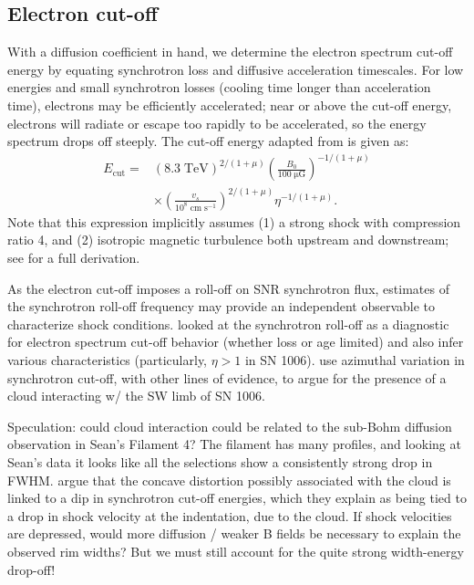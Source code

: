 \documentclass[iop, apj, numberedappendix, twocolappendix]{emulateapj}
\newcommand*{\mt}{\mathrm}
\newcommand*{\unit}[1]{\;\mt{#1}}  %
\newcommand*{\Ecut}{E_{\mt{cut}}}
\newcommand*{\muG}{\unit{\mu G}}
\begin{document}
\subsection{Electron cut-off}

With a diffusion coefficient in hand, we determine the electron spectrum
cut-off energy by equating synchrotron loss and diffusive acceleration
timescales.  For low energies and small synchrotron losses (cooling time longer
than acceleration time), electrons may be efficiently accelerated; near or
above the cut-off energy, electrons will radiate or escape too rapidly to be
accelerated, so the energy spectrum drops off steeply.  The cut-off energy
adapted from \citet{parizot2006} is given as:
\begin{align}
    \Ecut =
        &\left(8.3\unit{TeV}\right)^{2/(1+\mu)}
        \left(\frac{B_0}{100 \muG}\right)^{-1/(1+\mu)} \nonumber \\
        &\times \left(\frac{v_s}{10^8 \unit{cm\;s^{-1}}}\right)^{2/(1+\mu)}
        \eta^{-1 / (1+\mu)} .
\end{align}
Note that this expression implicitly assumes (1) a strong shock with
compression ratio 4, and (2) isotropic magnetic turbulence both upstream and
downstream; see \citet{parizot2006} for a full derivation.

As the electron cut-off imposes a roll-off on SNR synchrotron flux,
estimates of the synchrotron roll-off frequency may provide an independent
observable to characterize shock conditions.
\citet{miceli2013, yamazaki2014} looked at the synchrotron roll-off as a
diagnostic for electron spectrum cut-off behavior (whether loss or age limited)
and also infer various characteristics (particularly, $\eta > 1$ in SN 1006).
\citet{miceli2014-cloud} use azimuthal variation in synchrotron cut-off, with
other lines of evidence, to argue for the presence of a cloud interacting w/
the SW limb of SN 1006.

Speculation: could cloud interaction could be related to the sub-Bohm diffusion
observation in Sean's Filament 4?  The filament has many profiles, and looking
at Sean's data it looks like all the selections show a consistently strong drop
in FWHM.  \citet{miceli2013} argue that the concave distortion possibly
associated with the cloud is linked to a dip in synchrotron cut-off energies,
which they explain as being tied to a drop in shock velocity at the
indentation, due to the cloud.  If shock velocities are depressed, would more
diffusion / weaker B fields be necessary to explain the observed rim widths?
But we must still account for the quite strong width-energy drop-off!
\end{document}
